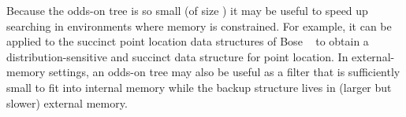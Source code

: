 \documentclass{patmorin}
\begin{document}
Because the odds-on tree is so small (of size ) it
may be useful to speed up searching in environments where memory is
constrained. For example, it can be applied to the succinct point
location data structures of Bose \etal\ \cite{bchmm09} to obtain a
distribution-sensitive and succinct data structure for point location.
In external-memory settings, an odds-on tree may also be useful as a
filter that is sufficiently small to fit into internal memory while the
backup structure lives in (larger but slower) external memory.






\end{document}
